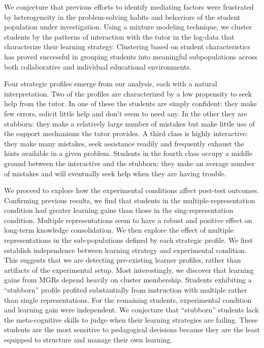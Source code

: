 \documentclass{edm_template}
\begin{document}
We conjecture that previous efforts to identify mediating factors were frustrated by heterogeneity in the problem-solving habits and behaviors of the student population under investigation. Using a mixture modeling technique, we cluster students by the patterns of interaction with the tutor in the log-data that characterize their learning strategy. Clustering based on student characteristics has proved successful in grouping students into meaningful subpopulations across both collaborative \cite{Perera2009} and individual \cite{Merceron2005} educational environments. 

Four strategic profiles emerge from our analysis, each with a natural interpretation. Two of the profiles are characterized by a low propensity to seek help from the tutor. In one of these the students are simply confident: they make few errors, solicit little help and don't seem to need any. In the other they are stubborn: they make a relatively large number of mistakes but make little use of the support mechanisms the tutor provides. A third class is highly interactive: they make many mistakes, seek assistance readily and frequently exhaust the hints available in a given problem. Students in the fourth class occupy a middle ground between the interactive and the stubborn: they make an average number of mistakes and will eventually seek help when they are having trouble.

We proceed to explore how the experimental conditions affect post-test outcomes. Confirming previous results, we find that students in the multiple-representation condition had greater learning gains than those in the sing-representation condition. Multiple representations seem to have a robust and positive effect on long-term knowledge consolidation. We then explore the effect of multiple representations in the sub-populations defined by each strategic profile. We first establish independence between learning strategy and experimental condition. This suggests that we are detecting pre-existing learner profiles, rather than artifacts of the experimental setup. Most interestingly, we discover that learning gains from MGRs depend heavily on cluster membership. Students exhibiting a ``stubborn'' profile profited substantially from instruction with multiple rather than single representations. For the remaining students, experimental condition and learning gain were independent. We conjecture that ``stubborn'' students lack the meta-cognitive skills to judge when their learning strategies are failing. These students are the most sensitive to pedagogical decisions because they are the least equipped to structure and manage their own learning. 
\end{document}
